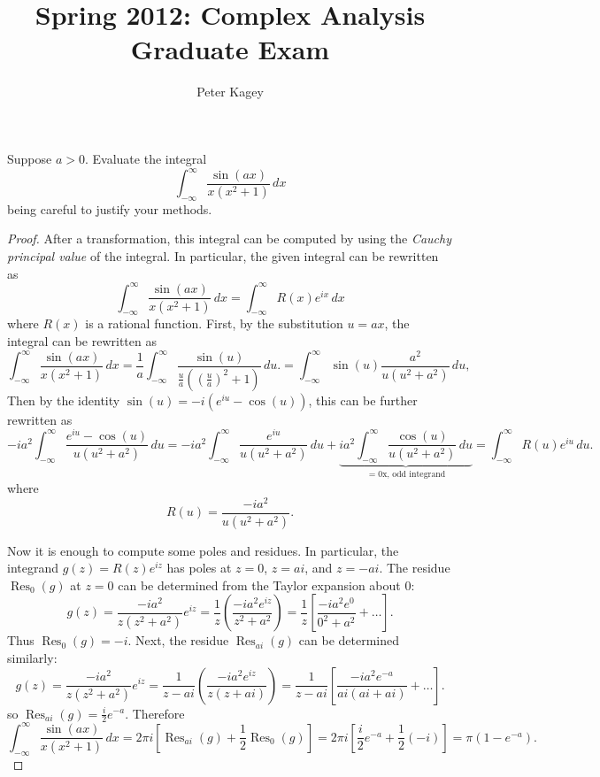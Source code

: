 \documentclass{article}
\newenvironment{problem}[2][Problem]{\begin{trivlist}
\item[\hskip \labelsep {\bfseries #1}\hskip \labelsep {\bfseries #2.}]}{\end{trivlist}}
\begin{document}
\title{Spring 2012: Complex Analysis Graduate Exam}
\author{Peter Kagey}

\maketitle

\begin{problem}{1}
  Suppose $a > 0$. Evaluate the integral \[
    \int_{-\infty}^{\infty} \frac{\sin(ax)}{x(x^2 + 1)}\, dx
  \] being careful to justify your methods.
\end{problem}

\begin{proof}
  After a transformation, this integral can be computed by using the
  \textit{Cauchy principal value} of the integral.
  In particular, the given integral can be rewritten as \[
    \int_{-\infty}^{\infty} \frac{\sin(ax)}{x(x^2 + 1)}\, dx = \int_{-\infty}^{\infty} R(x)e^{ix}\, dx
  \] where $R(x)$ is a rational function.
  First, by the substitution $u = ax$, the integral can be rewritten as
  \[
    \int_{-\infty}^{\infty} \frac{\sin(ax)}{x(x^2 + 1)}\, dx
    = \frac{1}{a} \int_{-\infty}^{\infty} \frac{\sin(u)}{\frac{u}{a}((\frac{u}{a})^2 + 1)}\, du.
    = \int_{-\infty}^{\infty} \sin(u)\frac{a^2}{u(u^2 + a^2)}\, du,
  \]
  Then by the identity $\sin(u) = -i(e^{iu} - \cos(u))$, this can be further rewritten as
  \[
    -ia^2 \int_{-\infty}^{\infty} \frac{e^{iu} - \cos(u)}{u(u^2 + a^2)}\, du
    = -ia^2 \int_{-\infty}^{\infty} \frac{e^{iu}}{u(u^2 + a^2)}\, du +
    \underbrace{
      ia^2 \int_{-\infty}^{\infty} \frac{\cos(u)}{u(u^2 + a^2)}\, du
    }_{=0\text{x, odd integrand}}
    = \int_{-\infty}^{\infty} R(u)e^{iu}\, du.
  \] where \[
    R(u) = \frac{-ia^2}{u(u^2 + a^2)}.
  \]

  Now it is enough to compute some poles and residues.
  In particular, the integrand $g(z) = R(z)e^{iz}$ has poles at $z = 0$, $z=ai$, and $z=-ai$.
  The residue $\operatorname{Res}_0(g)$ at $z=0$ can be determined from the Taylor expansion about $0$: \[
    g(z)
    = \frac{-ia^2}{z(z^2 + a^2)}e^{iz}
    = \frac{1}{z}\left(\frac{-ia^2e^{iz}}{z^2 + a^2}\right)
    = \frac{1}{z}\left[\frac{-ia^2e^{0}}{0^2 + a^2} + \hdots\right].
  \] Thus $\operatorname{Res}_0(g) = -i$.
  Next, the residue $\operatorname{Res}_{ai}(g)$ can be determined similarly:
  \[
    g(z)
    = \frac{-ia^2}{z(z^2 + a^2)}e^{iz}
    = \frac{1}{z - ai}\left(\frac{-ia^2e^{iz}}{z(z + ai)}\right)
    = \frac{1}{z - ai}\left[\frac{-ia^2e^{-a}}{ai(ai + ai)} + \hdots\right].
  \]
  so $\operatorname{Res}_{ai}(g) = \frac{i}{2}e^{-a}$.
  Therefore \[
    \int_{-\infty}^{\infty} \frac{\sin(ax)}{x(x^2 + 1)}\, dx
    = 2\pi i\left[ \operatorname{Res}_{ai}(g) + \frac{1}{2}\operatorname{Res}_0(g)\right]
    = 2\pi i\left[ \frac{i}{2}e^{-a} + \frac{1}{2}(-i)\right]
    = \pi(1 - e^{-a}).
  \]
\end{proof}
\end{document}
